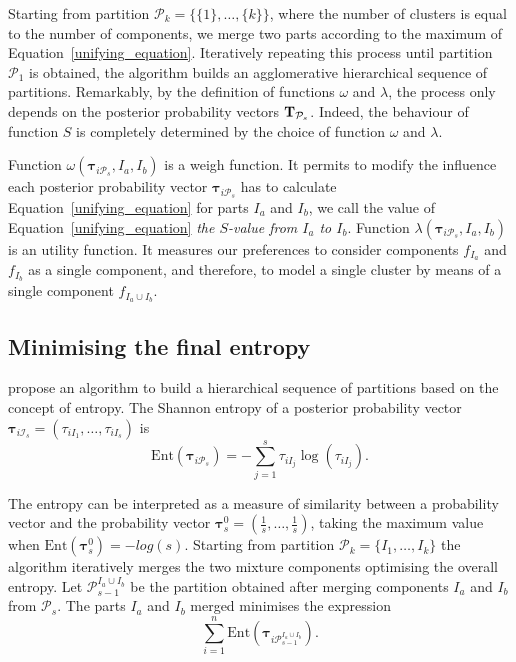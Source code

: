 \documentclass[submit]{smj}
\theoremstyle{definition}
\newcommand{\m}[1]{\boldsymbol{#1}}
\begin{document}
Starting from partition $\mathcal{P}_k = \{ \{1\}, \dots, \{k\} \}$, where the number of clusters is equal to the number of components, we merge two parts according to the maximum of Equation~\ref{unifying_equation}. Iteratively repeating this process until partition $\mathcal{P}_1$ is obtained, the algorithm builds an agglomerative hierarchical sequence of partitions. Remarkably, by the definition of functions $\omega$ and $\lambda$, the process only depends on the posterior probability vectors $\text{\textbf{T}}_{\mathcal{P}_s}$. Indeed, the behaviour of function $S$ is completely determined by the choice of function $\omega$ and $\lambda$.


Function $\omega(\m\tau_{i \mathcal{P}_s},  I_a,  I_b)$ is a weigh function. It permits to modify the influence each posterior probability vector $\m\tau_{i \mathcal{P}_s}$ has to calculate Equation~\ref{unifying_equation} for parts $I_a$ and $I_b$, we call the value of Equation~\ref{unifying_equation} \emph{the $S$-value from $I_a$ to $I_b$}. Function $\lambda(\m\tau_{i \mathcal{P}_s},  I_a,  I_b)$ is an utility function. It measures our preferences to consider components $f_{I_a}$ and $f_{I_b}$ as a single component, and therefore, to model a single cluster by means of a single component $f_{I_a \cup I_b}$.



\subsection{Minimising the final entropy}
\label{entropy_section}

\cite{baudry2010combining} propose an algorithm to build a hierarchical sequence of partitions based on the concept of entropy. The Shannon entropy of a posterior probability vector $\m\tau_{i \mathcal{I}_s} = \left( \tau_{i I_1} , \dots, \tau_{i I_s}  \right)$ is
\[
\text{Ent}( \m\tau_{i \mathcal{P}_s} ) = -\sum_{j=1}^s \tau_{i I_j}  \log(\tau_{i I_j} ).
\]

The entropy can be interpreted as a measure of similarity between a probability vector and the probability vector $\m\tau^0_{s}=\left(\frac{1}{s}, \dots, \frac{1}{s}\right)$, taking the maximum value when $\text{Ent}\left( \m\tau^0_{s} \right) = -log(s)$. Starting from partition $\mathcal{P}_k = \{ I_1, \dots, I_k\}$ the algorithm iteratively merges  the two mixture components optimising the overall entropy. Let $\mathcal{P}_{s-1}^{I_a\cup I_b}$ be the partition obtained after merging components $I_a$ and $I_b$ from $\mathcal{P}_s$. The parts $I_a$ and $I_b$ merged minimises the expression
\[
\sum_{i=1}^n \text{Ent}( \m\tau_{i \mathcal{P}_{s-1}^{I_a\cup I_b}} ).
\]
\end{document}
